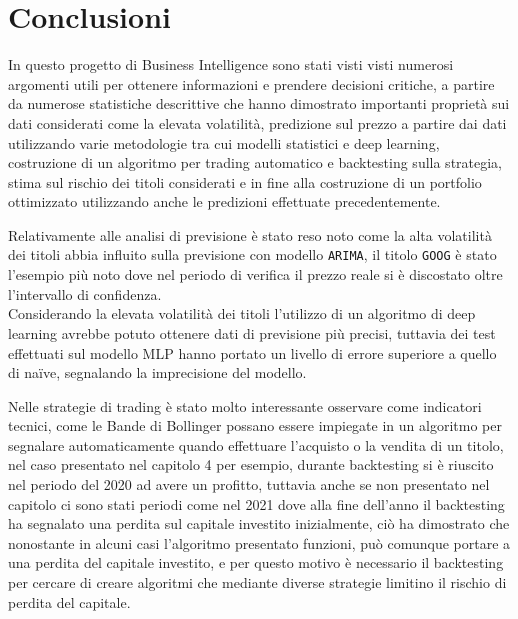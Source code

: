 
\section{Conclusioni}

In questo progetto di Business Intelligence sono stati visti visti numerosi argomenti utili per ottenere 
informazioni e prendere decisioni critiche, a partire da numerose statistiche descrittive che hanno
dimostrato importanti proprietà sui dati considerati come la elevata volatilità, predizione sul prezzo a partire
dai dati utilizzando varie metodologie tra cui modelli statistici e deep learning, costruzione di un algoritmo
per trading automatico e backtesting sulla strategia, stima sul rischio dei titoli considerati e in fine alla costruzione
di un portfolio ottimizzato utilizzando anche le predizioni effettuate precedentemente.

Relativamente alle analisi di previsione è stato reso noto come la alta volatilità dei titoli abbia influito sulla
previsione con modello \verb|ARIMA|, il titolo \verb|GOOG| è stato l'esempio più noto dove nel periodo di verifica il
prezzo reale si è discostato oltre l'intervallo di confidenza.\\
Considerando la elevata volatilità dei titoli l'utilizzo di un algoritmo di deep learning avrebbe potuto ottenere dati di previsione più precisi,
tuttavia dei test effettuati sul modello MLP hanno portato un livello di errore superiore a quello di naïve, segnalando la imprecisione del modello.

Nelle strategie di trading è stato molto interessante osservare come indicatori tecnici, come le Bande di Bollinger possano
essere impiegate in un algoritmo per segnalare automaticamente quando effettuare l'acquisto o la vendita di un titolo, nel caso presentato nel capitolo
4 per esempio, durante backtesting si è riuscito nel periodo del 2020 ad avere un profitto, tuttavia anche se non presentato nel capitolo ci sono
stati periodi come nel 2021 dove alla fine dell'anno il backtesting ha segnalato una perdita sul capitale investito inizialmente, ciò ha dimostrato che nonostante in
alcuni casi l'algoritmo presentato funzioni, può comunque portare a una perdita del capitale investito, e per questo motivo è necessario il backtesting per cercare di creare
algoritmi che mediante diverse strategie limitino il rischio di perdita del capitale.


